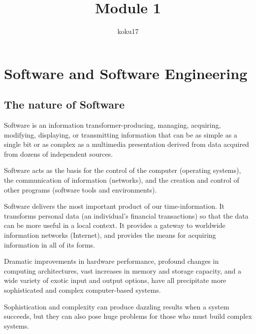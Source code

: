 \documentclass{article}
\author{koku17}
\title{Module 1}
\begin{document}
	 \maketitle \newpage
	 \tableofcontents \newpage

	\section{Software and Software Engineering}
	\subsection{The nature of Software}
	\par Software is an information transformer-producing, managing, acquiring, modifying, displaying, or
	transmitting information that can be as simple as a single bit or as complex as a multimedia presentation
	derived from data acquired from dozens of independent sources. \\

	\par Software acts as the basis for the control of the computer (operating systems), the communication of
	information (networks), and the creation and control of other programs (software tools and environments). \\

	\par Software delivers the most important product of our time-information.
	It transforms personal data (an individual's financial transactions) so that the data can be more
	useful in a local context.
	It provides a gateway to worldwide information networks (Internet), and provides the means for
	acquiring information in all of its forms. \\

	\par Dramatic improvements in hardware performance, profound changes in computing architectures, vast
	increases in memory and storage capacity, and a wide variety of exotic input and output options, have all
	precipitate more sophisticated and complex computer-based systems. \\

	\par Sophistication and complexity can produce dazzling results when a system succeeds, but they can also
	pose huge problems for those who must build complex systems. \\
\end{document}
